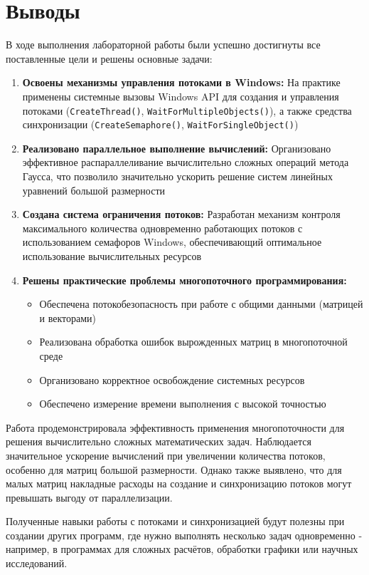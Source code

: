 \section{Выводы}

В ходе выполнения лабораторной работы были успешно достигнуты все поставленные цели и решены основные задачи:

\begin{enumerate}
    \item \textbf{Освоены механизмы управления потоками в Windows:} На практике применены системные вызовы Windows API для создания и управления потоками (\texttt{CreateThread()}, \texttt{WaitForMultipleObjects()}), а также средства синхронизации (\texttt{CreateSemaphore()}, \texttt{WaitForSingleObject()})
    
    \item \textbf{Реализовано параллельное выполнение вычислений:} Организовано эффективное распараллеливание вычислительно сложных операций метода Гаусса, что позволило значительно ускорить решение систем линейных уравнений большой размерности
    
    \item \textbf{Создана система ограничения потоков:} Разработан механизм контроля максимального количества одновременно работающих потоков с использованием семафоров Windows, обеспечивающий оптимальное использование вычислительных ресурсов
    
    \item \textbf{Решены практические проблемы многопоточного программирования:} 
    \begin{itemize}
        \item Обеспечена потокобезопасность при работе с общими данными (матрицей и векторами)
        \item Реализована обработка ошибок вырожденных матриц в многопоточной среде
        \item Организовано корректное освобождение системных ресурсов
        \item Обеспечено измерение времени выполнения с высокой точностью
    \end{itemize}
\end{enumerate}

Работа продемонстрировала эффективность применения многопоточности для решения вычислительно сложных математических задач. Наблюдается значительное ускорение вычислений при увеличении количества потоков, особенно для матриц большой размерности. Однако также выявлено, что для малых матриц накладные расходы на создание и синхронизацию потоков могут превышать выгоду от параллелизации.

Полученные навыки работы с потоками и синхронизацией будут полезны при создании других программ, где нужно выполнять несколько задач одновременно - например, в программах для сложных расчётов, обработки графики или научных исследований.

\pagebreak
